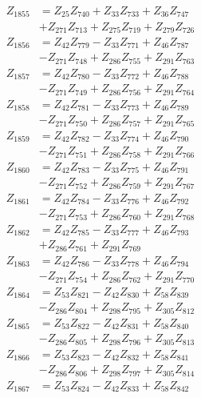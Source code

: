 \begin{multicols}{2}
\begin{align}
Z_{1855} &= Z_{25}Z_{740} + Z_{33}Z_{733} + Z_{36}Z_{747}  \nonumber \\
&+ Z_{271}Z_{713} + Z_{275}Z_{719} + Z_{279}Z_{726} \nonumber \\
Z_{1856} &= Z_{42}Z_{779} - Z_{33}Z_{771} + Z_{46}Z_{787}  \nonumber \\
&- Z_{271}Z_{748} + Z_{286}Z_{755} + Z_{291}Z_{763} \nonumber \\
Z_{1857} &= Z_{42}Z_{780} - Z_{33}Z_{772} + Z_{46}Z_{788}  \nonumber \\
&- Z_{271}Z_{749} + Z_{286}Z_{756} + Z_{291}Z_{764} \nonumber \\
Z_{1858} &= Z_{42}Z_{781} - Z_{33}Z_{773} + Z_{46}Z_{789}  \nonumber \\
&- Z_{271}Z_{750} + Z_{286}Z_{757} + Z_{291}Z_{765} \nonumber \\
Z_{1859} &= Z_{42}Z_{782} - Z_{33}Z_{774} + Z_{46}Z_{790}  \nonumber \\
&- Z_{271}Z_{751} + Z_{286}Z_{758} + Z_{291}Z_{766} \nonumber \\
Z_{1860} &= Z_{42}Z_{783} - Z_{33}Z_{775} + Z_{46}Z_{791}  \nonumber \\
&- Z_{271}Z_{752} + Z_{286}Z_{759} + Z_{291}Z_{767} \nonumber \\
Z_{1861} &= Z_{42}Z_{784} - Z_{33}Z_{776} + Z_{46}Z_{792}  \nonumber \\
&- Z_{271}Z_{753} + Z_{286}Z_{760} + Z_{291}Z_{768} \nonumber \\
Z_{1862} &= Z_{42}Z_{785} - Z_{33}Z_{777} + Z_{46}Z_{793}  \nonumber \\
&+ Z_{286}Z_{761} + Z_{291}Z_{769} \nonumber \\
Z_{1863} &= Z_{42}Z_{786} - Z_{33}Z_{778} + Z_{46}Z_{794}  \nonumber \\
&- Z_{271}Z_{754} + Z_{286}Z_{762} + Z_{291}Z_{770} \nonumber \\
Z_{1864} &= Z_{53}Z_{821} - Z_{42}Z_{830} + Z_{58}Z_{839}  \nonumber \\
&- Z_{286}Z_{804} + Z_{298}Z_{795} + Z_{305}Z_{812} \nonumber \\
Z_{1865} &= Z_{53}Z_{822} - Z_{42}Z_{831} + Z_{58}Z_{840}  \nonumber \\
&- Z_{286}Z_{805} + Z_{298}Z_{796} + Z_{305}Z_{813} \nonumber \\
Z_{1866} &= Z_{53}Z_{823} - Z_{42}Z_{832} + Z_{58}Z_{841}  \nonumber \\
&- Z_{286}Z_{806} + Z_{298}Z_{797} + Z_{305}Z_{814} \nonumber \\
Z_{1867} &= Z_{53}Z_{824} - Z_{42}Z_{833} + Z_{58}Z_{842}  \nonumber \\

\end{align}
\end{multicols}
